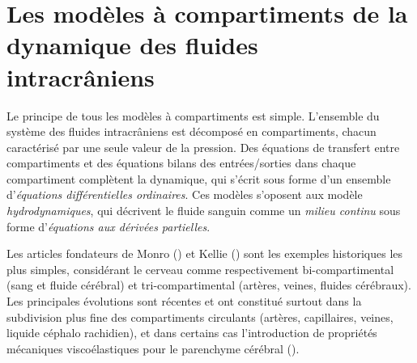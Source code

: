 \section{Les modèles à compartiments de la dynamique des fluides intracrâniens}
\label{sec:modeles_compartiments}
Le principe de tous les modèles à compartiments est simple. L'ensemble du système des fluides
intracrâniens est décomposé en compartiments, chacun caractérisé par une seule valeur de la
pression. Des équations de transfert entre compartiments et des équations bilans des entrées/sorties
dans chaque compartiment complètent la dynamique, qui s'écrit sous forme d'un ensemble d'{\em équations différentielles ordinaires}. Ces modèles s'oposent aux modèle {\em hydrodynamiques}, qui décrivent le fluide sanguin comme un {\em milieu continu} sous forme d'{\em équations aux dérivées partielles}.

Les articles fondateurs de Monro  (\cite{Monro2010}) et Kellie (\cite{Kellie1824}) sont les exemples historiques les plus
simples, considérant le cerveau comme respectivement bi-compartimental (sang et fluide cérébral) et
tri-compartimental (artères, veines, fluides cérébraux). Les principales évolutions sont récentes et ont
constitué surtout dans la subdivision plus fine des compartiments circulants (artères, capillaires,
veines, liquide céphalo rachidien), et dans certains cas l'introduction de propriétés mécaniques
viscoélastiques pour le parenchyme cérébral (\cite{Sorek1988}).

